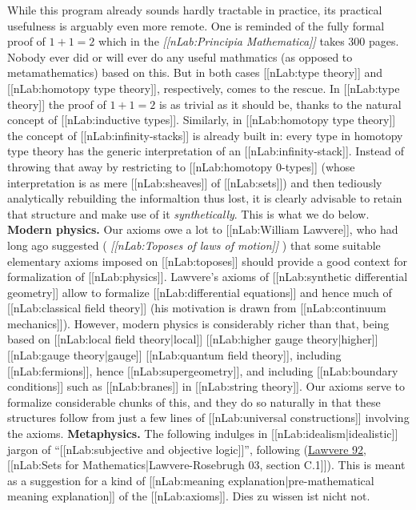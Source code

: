 \documentclass[12pt,titlepage]{article}
\theoremstyle{plain}
\theoremstyle{definition}
\theoremstyle{remark}
\begin{document}
While this program already sounds hardly tractable in practice, its practical usefulness is arguably even more remote. One is reminded of the fully formal proof of $1+1 = 2$ which in the \emph{[[nLab:Principia Mathematica]]} takes 300 pages. Nobody ever did or will ever do any useful mathmatics (as opposed to metamathematics) based on this.
But in both cases [[nLab:type theory]] and [[nLab:homotopy type theory]], respectively, comes to the rescue. In [[nLab:type theory]] the proof of $1+1 = 2$ is as trivial as it should be, thanks to the natural concept of [[nLab:inductive types]]. Similarly, in [[nLab:homotopy type theory]] the concept of [[nLab:infinity-stacks]] is already built in: every type in homotopy type theory has the generic interpretation of an [[nLab:infinity-stack]]. Instead of throwing that away by restricting to [[nLab:homotopy 0-types]] (whose interpretation is as mere [[nLab:sheaves]] of [[nLab:sets]]) and then tediously analytically rebuilding the informaltion thus lost, it is clearly advisable to retain that structure and make use of it \emph{synthetically}. This is what we do below.
\textbf{Modern physics.} Our axioms owe a lot to [[nLab:William Lawvere]], who had long ago suggested ( \emph{[[nLab:Toposes of laws of motion]]} ) that some suitable elementary axioms imposed on [[nLab:toposes]] should provide a good context for formalization of [[nLab:physics]]. Lawvere's axioms of [[nLab:synthetic differential geometry]] allow to formalize [[nLab:differential equations]] and hence much of [[nLab:classical field theory]] (his motivation is drawn from [[nLab:continuum mechanics]]). However, modern physics is considerably richer than that, being based on [[nLab:local field theory|local]] [[nLab:higher gauge theory|higher]] [[nLab:gauge theory|gauge]] [[nLab:quantum field theory]], including [[nLab:fermions]], hence [[nLab:supergeometry]], and including [[nLab:boundary conditions]] such as [[nLab:branes]] in [[nLab:string theory]]. Our axioms serve to formalize considerable chunks of this, and they do so naturally in that these structures follow from just a few lines of [[nLab:universal constructions]] involving the axioms.
\textbf{Metaphysics.} The following indulges in [[nLab:idealism|idealistic]] jargon of ``[[nLab:subjective and objective logic]]'', following (\href{http://ncatlab.org/nlab/show/objective+and+subjective+logic#Lawvere92}{Lawvere 92}, [[nLab:Sets for Mathematics|Lawvere-Rosebrugh 03, section C.1]]). This is meant as a suggestion for a kind of [[nLab:meaning explanation|pre-mathematical meaning explanation]] of the [[nLab:axioms]]. Dies zu wissen ist nicht not.
\end{document}
